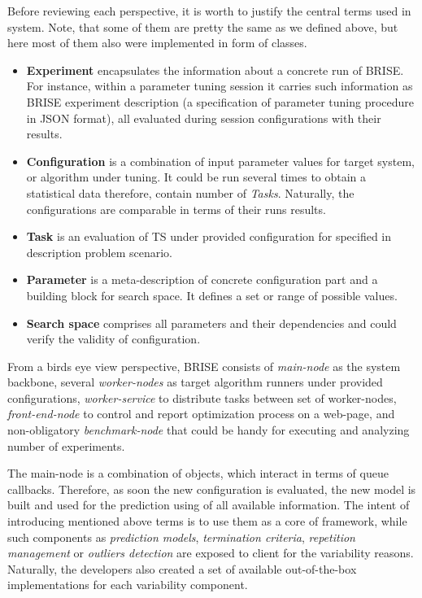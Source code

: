 Before reviewing each perspective, it is worth to justify the central terms used in system. Note, that some of them are pretty the same as we defined above, but here most of them also were implemented in form of classes.
\begin{itemize}
	\item \textbf{Experiment} encapsulates the information about a concrete run of BRISE. For instance, within a parameter tuning session it carries such information as BRISE experiment description (a specification of parameter tuning procedure in JSON format), all evaluated during session configurations with their results.

	\item \textbf{Configuration} is a combination of input parameter values for target system, or algorithm under tuning. It could be run several times to obtain a statistical data therefore, contain number of \emph{Tasks}. Naturally, the configurations are comparable in terms of their runs results.

	\item \textbf{Task} is an evaluation of TS under provided configuration for specified in description problem scenario.

	\item \textbf{Parameter} is a meta-description of concrete configuration part and a building block for search space. It defines a set or range of possible values.

	\item \textbf{Search space} comprises all parameters and their dependencies and could verify the validity of configuration.
\end{itemize}

From a birds eye view perspective, BRISE consists of \emph{main-node} as the system backbone, several \emph{worker-nodes} as target algorithm runners under provided configurations, \emph{worker-service} to distribute tasks between set of worker-nodes, \emph{front-end-node} to control and report optimization process on a web-page, and non-obligatory \emph{benchmark-node} that could be handy for executing and analyzing number of experiments.

The main-node is a combination of objects, which interact in terms of queue callbacks. Therefore, as soon the new configuration is evaluated, the new model is built and used for the prediction using of all available information. The intent of introducing mentioned above terms is to use them as a core of framework, while such components as \emph{prediction models}, \emph{termination criteria}, \emph{repetition management} or \emph{outliers detection} are exposed to client for the variability reasons. Naturally, the developers also created a set of available out-of-the-box implementations for each variability component.

